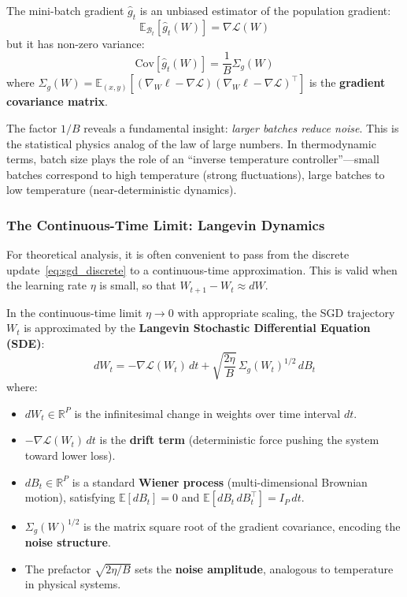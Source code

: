 \documentclass[
  journal=largetwo,
  simfonts=false,
  year=2025,
  volume=37,
]{cup-journal}
\begin{document}
The mini-batch gradient $\hat{g}_t$ is an unbiased estimator of the population gradient:
\begin{equation}
    \mathbb{E}_{\mathcal{B}_t}[\hat{g}_t(W)] = \nabla \mathcal{L}(W)
\end{equation}
but it has non-zero variance:
\begin{equation}
    \text{Cov}[\hat{g}_t(W)] = \frac{1}{B} \Sigma_g(W)
\end{equation}
where $\Sigma_g(W) = \mathbb{E}_{(x,y)}[(\nabla_W \ell - \nabla \mathcal{L})(\nabla_W \ell - \nabla \mathcal{L})^\top]$ is the \textbf{gradient covariance matrix}.

\begin{remark}
The factor $1/B$ reveals a fundamental insight: \textit{larger batches reduce noise}. This is the statistical physics analog of the law of large numbers. In thermodynamic terms, batch size plays the role of an ``inverse temperature controller''---small batches correspond to high temperature (strong fluctuations), large batches to low temperature (near-deterministic dynamics).
\end{remark}

\subsubsection{The Continuous-Time Limit: Langevin Dynamics}

For theoretical analysis, it is often convenient to pass from the discrete update~\eqref{eq:sgd_discrete} to a continuous-time approximation. This is valid when the learning rate $\eta$ is small, so that $W_{t+1} - W_t \approx dW$.

\begin{definition}\label{def:langevin_sgd}
In the continuous-time limit $\eta \to 0$ with appropriate scaling, the SGD trajectory $W_t$ is approximated by the \textbf{Langevin Stochastic Differential Equation (SDE)}:
\begin{equation}\label{eq:langevin_formal}
    \boxed{dW_t = -\nabla \mathcal{L}(W_t) \, dt + \sqrt{\frac{2\eta}{B}} \, \Sigma_g(W_t)^{1/2} \, dB_t}
\end{equation}
where:
\begin{itemize}
    \item $dW_t \in \mathbb{R}^P$ is the infinitesimal change in weights over time interval $dt$.
    \item $-\nabla \mathcal{L}(W_t) \, dt$ is the \textbf{drift term} (deterministic force pushing the system toward lower loss).
    \item $dB_t \in \mathbb{R}^P$ is a standard \textbf{Wiener process} (multi-dimensional Brownian motion), satisfying $\mathbb{E}[dB_t] = 0$ and $\mathbb{E}[dB_t \, dB_t^\top] = I_P \, dt$.
    \item $\Sigma_g(W)^{1/2}$ is the matrix square root of the gradient covariance, encoding the \textbf{noise structure}.
    \item The prefactor $\sqrt{2\eta/B}$ sets the \textbf{noise amplitude}, analogous to temperature in physical systems.
\end{itemize}
\end{definition}
\end{document}

